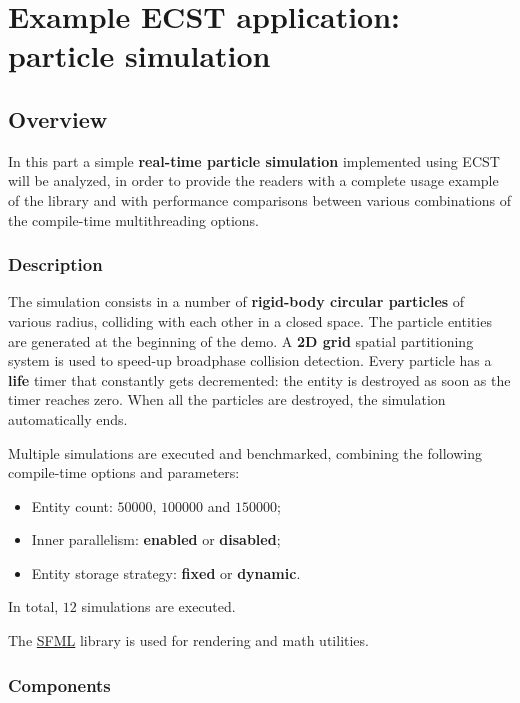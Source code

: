 \documentclass[twoside, 12pt, a4paper, openany]{book}
\begin{document}
\part{Example ECST application: particle simulation}

\hypertarget{part3_sim}{\chapter{Overview}\label{part3_sim}}

In this part a simple \textbf{real-time particle simulation} implemented
using ECST will be analyzed, in order to provide the readers with a
complete usage example of the library and with performance comparisons
between various combinations of the compile-time multithreading options.

\section{Description}\label{description}

The simulation consists in a number of \textbf{rigid-body circular
particles} of various radius, colliding with each other in a closed
space. The particle entities are generated at the beginning of the demo.
A \textbf{2D grid} spatial partitioning system is used to speed-up
broadphase collision detection. Every particle has a \textbf{life} timer
that constantly gets decremented: the entity is destroyed as soon as the
timer reaches zero. When all the particles are destroyed, the simulation
automatically ends.

Multiple simulations are executed and benchmarked, combining the
following compile-time options and parameters:

\begin{itemize}
\item
  Entity count: \(50000\), \(100000\) and \(150000\);
\item
  Inner parallelism: \textbf{enabled} or \textbf{disabled};
\item
  Entity storage strategy: \textbf{fixed} or \textbf{dynamic}.
\end{itemize}

In total, \(12\) simulations are executed.

The \href{http://sfml-dev.org}{SFML} library is used for rendering and
math utilities.

\section{Components}\label{components}
\end{document}
